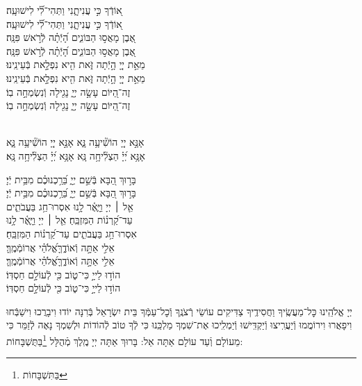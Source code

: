 \documentclass[twoside, openany, parskip=half, 11pt]{book}
\begin{document}
{\begin{narrow}
א֭וֹדְֿךָ כִּ֣י עֲנִיתָ֑נִי \hfill וַתְּהִי־לִ֗֝י לִישׁוּעָֽה׃ \\
\scriptsize{ א֭וֹדְֿךָ כִּ֣י עֲנִיתָ֑נִי \hfill וַתְּהִי־לִ֗֝י לִישׁוּעָֽה׃ \\}\normalsize{}
אֶ֭בֶן מָאֲס֣וּ הַבּוֹנִ֑ים \hfill הָ֝יְֿתָ֗ה לְֿרֹ֣אשׁ פִּנָּֽה׃ \\
\scriptsize{ אֶ֭בֶן מָאֲס֣וּ הַבּוֹנִ֑ים \hfill הָ֝יְֿתָ֗ה לְֿרֹ֣אשׁ פִּנָּֽה׃ \\}\normalsize{}
מֵאֵ֣ת יְיָ֭ הָ֣יְֿתָה זֹּ֑את \hfill הִ֖יא נִפְלָ֣את בְּֿעֵינֵֽינוּ׃ \\
\scriptsize{ מֵאֵ֣ת יְיָ֭ הָ֣יְֿתָה זֹּ֑את \hfill הִ֖יא נִפְלָ֣את בְּֿעֵינֵֽינוּ׃ \\}\normalsize{}
זֶה־הַ֭יּוֹם עָשָׂ֣ה יְיָ֑ \hfill נָגִ֖ילָה וְֿנִשְׂמְחָ֣ה בֽוֹ׃ \\
\scriptsize{ זֶה־הַ֭יּוֹם עָשָׂ֣ה יְיָ֑ \hfill נָגִ֖ילָה וְֿנִשְׂמְחָ֣ה בֽוֹ׃ } \normalsize{}


\\
אָנָּ֣א יְיָ֭ הוֹשִׁ֘יעָ֥ה נָּ֑א \hfill \scriptsize{אָנָּ֣א יְיָ֭ הוֹשִׁ֘יעָ֥ה נָּ֑א}\\ \normalsize
אָנָּ֥א יְ֝יָ֗ הַצְלִ֘יחָ֥ה נָּֽא \hfill \scriptsize{ אָנָּ֥א יְ֝יָ֗ הַצְלִ֘יחָ֥ה נָּֽא׃}\\ \normalsize


בָּר֣וּךְ הַ֭בָּא בְּֿשֵׁ֣ם יְיָ֑ \hfill בֵּ֝רַ֥כְנוּכֶ֗ם מִבֵּ֥ית יְֿיָ׃\\
\scriptsize{בָּר֣וּךְ הַ֭בָּא בְּֿשֵׁ֣ם יְיָ֑ \hfill בֵּ֝רַ֥כְנוּכֶ֗ם מִבֵּ֥ית יְֿיָ׃}\\
\normalsize{אֵ֤ל ׀ יְיָ וַיָּ֢אֶ֫ר לָ֥נוּ \hfill אִסְרוּ־חַ֥ג בַּעֲבֹתִ֑ים \\ עַד־קַ֝רְנ֗וֹת הַמִּזְבֵּֽחַ׃ \hfill }
\scriptsize{אֵ֤ל ׀ יְיָ וַיָּ֢אֶ֫ר לָ֥נוּ \\ אִסְרוּ־חַ֥ג בַּעֲבֹתִ֑ים \hfill עַד־קַ֝רְנ֗וֹת הַמִּזְבֵּֽחַ׃}\\
\normalsize{אֵלִ֣י אַתָּ֣ה וְֿאוֹדֶ֑ךָּ\hfill אֱ֝לֹהַ֗י אֲרוֹמְֿמֶֽךָּ׃}\\
\scriptsize{אֵלִ֣י אַתָּ֣ה וְֿאוֹדֶ֑ךָּ\hfill אֱ֝לֹהַ֗י אֲרוֹמְֿמֶֽךָּ׃}\\
\normalsize{הוֹד֣וּ לַייָ֣ כִּי־ט֑וֹב \hfill כִּ֖י לְֿעוֹלָ֣ם חַסְדּֽוֹ׃ }\\
\scriptsize{הוֹד֣וּ לַייָ֣ כִּי־ט֑וֹב \hfill כִּ֖י לְֿעוֹלָ֣ם חַסְדּֽוֹ׃ } \\
\normalsize{}

\end{narrow}

\negline

יְיָ אֱלֹהֵֽינוּ כׇּל־מַעֲשֶֽׂיךָ וַחֲסִידֶֽיךָ צַדִּיקִים עוֹשֵׂי רְֿצֹנֶֽךָ וְֿכׇל־עַמְּֿךָ בֵּית יִשְׂרָאֵל בְּֿרִנָּה יוֹדוּ וִיבָרֲכוּ וִישַׁבְּֿחוּ וִיפָאֲרוּ וִירוֹמֲמוּ וְֿיַעֲרִֽיצוּ וְֿיַקְדִּֽישׁוּ וְֿיַמְלִֽיכוּ אֶת־שִׁמְךָ מַלְכֵּֽנוּ כִּי לְֿךָ טוֹב לְֿהוֹדוֹת וּלְשִׁמְךָ נָאֶה לְֿזַמֵּר כִּי מֵעוֹלָם וְֿעַד עוֹלָם אַתָּה אֵל: בָּרוּךְ אַתָּה יְיָ מֶֽלֶךְ מְֿהֻלָּל \footnote{בַּתִּשְׁבָּחוֹת}בַּתֻּשְׁבָּחוֹת:
}
\end{document}
